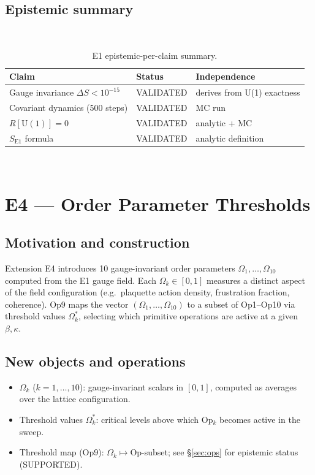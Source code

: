 \documentclass[12pt,a4paper]{article}
\theoremstyle{plain}
\theoremstyle{definition}
\theoremstyle{remark}
\begin{document}
\subsection{Epistemic summary}

\begin{table}[htbp]
\caption{E1 epistemic-per-claim summary.}
\label{tab:E1-epistemic}
\
\begin{tabular}{lll}
\toprule
Claim & Status & Independence \\
\midrule
Gauge invariance $\Delta S < 10^{-15}$ & VALIDATED & derives from U(1) exactness \\
Covariant dynamics (500 steps) & VALIDATED & MC run \\
$R[\mathrm{U(1)}]=0$ & VALIDATED & analytic + MC \\
$S_{\mathrm{E1}}$ formula & VALIDATED & analytic definition \\
\bottomrule
\end{tabular}
\
\end{table}

\section{E4 --- Order Parameter Thresholds}
\label{sec:E4}

\subsection{Motivation and construction}

Extension E4 introduces 10 gauge-invariant order parameters
$\Omega_1,\ldots,\Omega_{10}$ computed from the E1 gauge field.
Each $\Omega_k\in[0,1]$ measures a distinct aspect of the field configuration
(e.g.\ plaquette action density, frustration fraction, coherence).
Op9 maps the vector $(\Omega_1,\ldots,\Omega_{10})$ to a subset of
Op1--Op10 via threshold values $\Omega_k^*$, selecting which primitive
operations are active at a given $\beta, \kappa$.

\subsection{New objects and operations}

\begin{itemize}[nosep]
  \item $\Omega_k$ ($k=1,\ldots,10$): gauge-invariant scalars in $[0,1]$,
        computed as averages over the lattice configuration.
  \item Threshold values $\Omega_k^*$: critical levels above which Op$_k$
        becomes active in the sweep.
  \item Threshold map (Op9): $\Omega_k\mapsto\mathrm{Op}$-subset;
        see \S\ref{sec:ops} for epistemic status (SUPPORTED).
\end{itemize}
\end{document}
